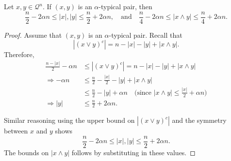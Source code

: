 \documentclass[10pt,a4paper]{amsart}
\begin{document}
\begin{lemma} \label{lem: alpha typical pair}
Let $x, y \in \mathcal{Q}^n$. If $(x, y)$ is an $\alpha$-typical pair, then
\[
\frac{n}{2} - 2\alpha n \leq |x|, |y| \leq \frac{n}{2} + 2\alpha n, \quad \text{and} \quad \frac{n}{4} - 2\alpha n \leq |x \land y| \leq \frac{n}{4} + 2\alpha n.
\]

\end{lemma}

\begin{proof}
Assume that $(x, y)$ is an $\alpha$-typical pair. 
Recall that
\[
|(x \lor y)^c| = n - |x| - |y| + |x \land y|.
\]
Therefore, 
\begin{align*}
\frac{n - |x|}{2} - \alpha n &\leq  |(x \lor y)^c| = n - |x| - |y| + |x \land y| \\
\Rightarrow -\alpha n &\leq \frac{n}{2} - \frac{|x|}{2} - |y| + |x \land y| \\
&\leq \frac{n}{2} - |y| + \alpha n \quad \text{(since $|x \land y| \leq \frac{|x|}{2} + \alpha n$)} \\
\Rightarrow |y| &\leq \frac{n}{2} + 2\alpha n.
\end{align*}

Similar reasoning using the upper bound on $|(x \lor y)^c|$ and the symmetry between $x$ and $y$ shows
\[
\frac{n}{2} - 2\alpha n \leq |x|, |y| \leq \frac{n}{2} + 2\alpha n.
\]
The bounds on $|x \land y|$ follows by substituting in these values.
\end{proof}
\end{document}
